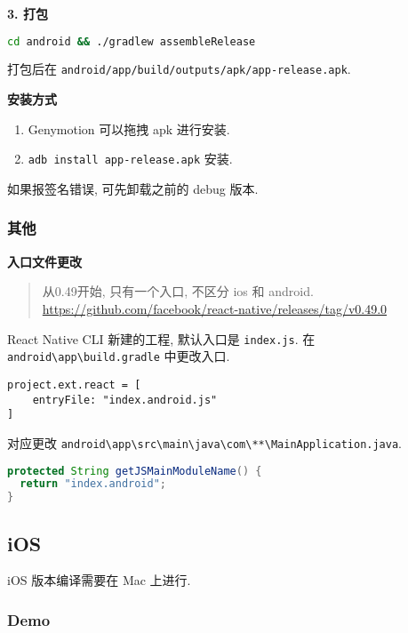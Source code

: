 \textbf{3. 打包}

\begin{lstlisting}[language=bash]
cd android && ./gradlew assembleRelease
\end{lstlisting}

打包后在 \lstinline!android/app/build/outputs/apk/app-release.apk!.

\textbf{安装方式}

\begin{enumerate}
\def\labelenumi{\arabic{enumi}.}
\tightlist
\item
  Genymotion 可以拖拽 apk 进行安装.
\item
  \lstinline!adb install app-release.apk! 安装.
\end{enumerate}

如果报签名错误, 可先卸载之前的 debug 版本.

\subsubsection{其他}\label{ux5176ux4ed6}

\textbf{入口文件更改}

\begin{quote}
从0.49开始, 只有一个入口, 不区分 ios 和 android.
\url{https://github.com/facebook/react-native/releases/tag/v0.49.0}
\end{quote}

React Native CLI 新建的工程, 默认入口是 \lstinline!index.js!. 在
\lstinline!android\app\build.gradle! 中更改入口.

\begin{lstlisting}
project.ext.react = [
    entryFile: "index.android.js"
]
\end{lstlisting}

对应更改
\lstinline!android\app\src\main\java\com\**\MainApplication.java!.

\begin{lstlisting}[language=Java]
protected String getJSMainModuleName() {
  return "index.android";
}
\end{lstlisting}

\subsection{iOS}\label{ios}

iOS 版本编译需要在 Mac 上进行.

\subsubsection{Demo}\label{demo-1}

